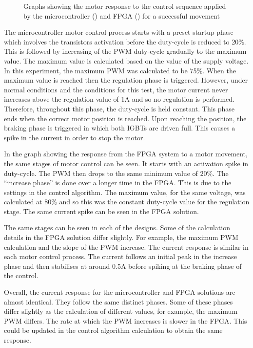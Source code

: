 \begin{figure}
\centering


\caption{Graphs showing the motor response to the control sequence applied by the microcontroller () and FPGA () for a successful movement}
\label{movement_test}
\end{figure}

The microcontroller motor control process starts with a preset startup phase which involves the transistors activation before the duty-cycle is reduced to 20\%. This is followed by increasing of the PWM duty-cycle gradually to the maximum value. The maximum value is calculated based on the value of the supply voltage. In this experiment, the maximum PWM was calculated to be 75\%. When the maximum value is reached then the regulation phase is triggered. However, under normal conditions and the conditions for this test, the motor current never increases above the regulation value of 1A and so no regulation is performed. Therefore, throughout this phase, the duty-cycle is held constant. This phase ends when the correct motor position is reached. Upon reaching the position, the braking phase is triggered in which both IGBTs are driven full. This causes a spike in the current in order to stop the motor.

In the graph showing the response from the FPGA system to a motor movement, the same stages of motor control can be seen. It starts with an activation spike in duty-cycle. The PWM then drops to the same minimum value of 20\%. The ``increase phase'' is done over a longer time in the FPGA. This is due to the settings in the control algorithm. The maximum value, for the same voltage, was calculated at 80\% and so this was the constant duty-cycle value for the regulation stage. The same current spike can be seen in the FPGA solution.

The same stages can be seen in each of the designs. Some of the calculation details in the FPGA solution differ slightly. For example, the maximum PWM calculation and the slope of the PWM increase. The current response is similar in each motor control process. The current follows an initial peak in the increase phase and then stabilises at around 0.5A before spiking at the braking phase of the control.

Overall, the current response for the microcontroller and FPGA solutions are almost identical. They follow the same distinct phases. Some of these phases differ slightly as the calculation of different values, for example, the maximum PWM differs. The rate at which the PWM increases is slower in the FPGA. This could be updated in the control algorithm calculation to obtain the same response.

